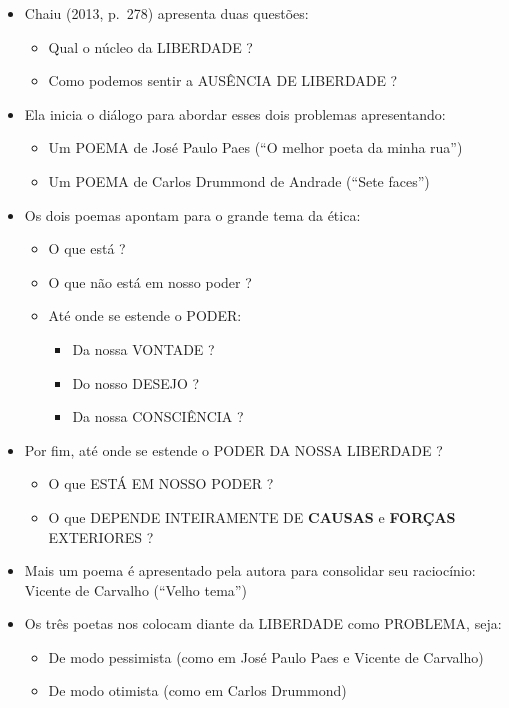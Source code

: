 \documentclass[
]{book}
\providecommand{\tightlist}{%
  \setlength{\itemsep}{0pt}\setlength{\parskip}{0pt}}
\begin{document}
\begin{itemize}
\tightlist
\item
  Chaiu (2013, p.~278) apresenta duas questões:

  \begin{itemize}
  \tightlist
  \item
    Qual o núcleo da LIBERDADE ?
  \item
    Como podemos sentir a AUSÊNCIA DE LIBERDADE ?
  \end{itemize}
\item
  Ela inicia o diálogo para abordar esses dois problemas apresentando:

  \begin{itemize}
  \tightlist
  \item
    Um POEMA de José Paulo Paes (``O melhor poeta da minha rua'')
  \item
    Um POEMA de Carlos Drummond de Andrade (``Sete faces'')
  \end{itemize}
\item
  Os dois poemas apontam para o grande tema da ética:

  \begin{itemize}
  \tightlist
  \item
    O que está ?
  \item
    O que não está em nosso poder ?
  \item
    Até onde se estende o PODER:

    \begin{itemize}
    \tightlist
    \item
      Da nossa VONTADE ?
    \item
      Do nosso DESEJO ?
    \item
      Da nossa CONSCIÊNCIA ?
    \end{itemize}
  \end{itemize}
\item
  Por fim, até onde se estende o PODER DA NOSSA LIBERDADE ?

  \begin{itemize}
  \tightlist
  \item
    O que ESTÁ EM NOSSO PODER ?
  \item
    O que DEPENDE INTEIRAMENTE DE \textbf{CAUSAS} e \textbf{FORÇAS} EXTERIORES ?
  \end{itemize}
\item
  Mais um poema é apresentado pela autora para consolidar seu raciocínio: Vicente de Carvalho (``Velho tema'')
\item
  Os três poetas nos colocam diante da LIBERDADE como PROBLEMA, seja:

  \begin{itemize}
  \tightlist
  \item
    De modo pessimista (como em José Paulo Paes e Vicente de Carvalho)
  \item
    De modo otimista (como em Carlos Drummond)
  \end{itemize}
\end{itemize}
\end{document}
